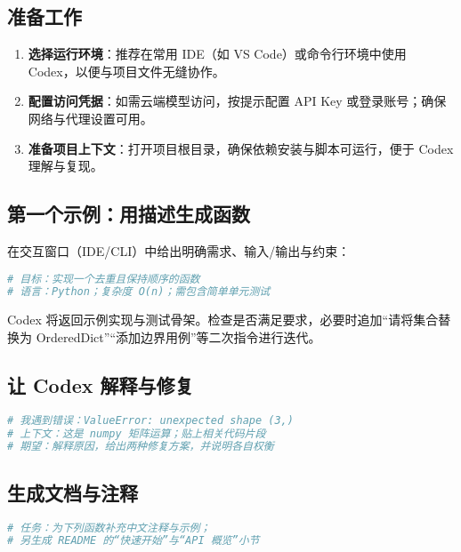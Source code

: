 \documentclass[UTF8,zihao=-4]{ctexart}
\begin{document}
\subsection{准备工作}
\begin{enumerate}
  \item \textbf{选择运行环境}：推荐在常用 IDE（如 VS Code）或命令行环境中使用 Codex，以便与项目文件无缝协作。
  \item \textbf{配置访问凭据}：如需云端模型访问，按提示配置 API Key 或登录账号；确保网络与代理设置可用。
  \item \textbf{准备项目上下文}：打开项目根目录，确保依赖安装与脚本可运行，便于 Codex 理解与复现。
\end{enumerate}

\subsection{第一个示例：用描述生成函数}
在交互窗口（IDE/CLI）中给出明确需求、输入/输出与约束：

\begin{lstlisting}[language=bash,caption={以自然语言描述需求}]
# 目标：实现一个去重且保持顺序的函数
# 语言：Python；复杂度 O(n)；需包含简单单元测试
\end{lstlisting}

Codex 将返回示例实现与测试骨架。检查是否满足要求，必要时追加“请将集合替换为 OrderedDict”“添加边界用例”等二次指令进行迭代。

\subsection{让 Codex 解释与修复}
\begin{lstlisting}[language=bash,caption={让 Codex 解释报错并提出修复}]
# 我遇到错误：ValueError: unexpected shape (3,)
# 上下文：这是 numpy 矩阵运算；贴上相关代码片段
# 期望：解释原因，给出两种修复方案，并说明各自权衡
\end{lstlisting}

\subsection{生成文档与注释}
\begin{lstlisting}[language=bash,caption={从代码生成注释与 README 片段}]
# 任务：为下列函数补充中文注释与示例；
# 另生成 README 的“快速开始”与“API 概览”小节
\end{lstlisting}
\end{document}
